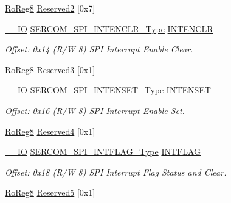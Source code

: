 \begin{DoxyCompactItemize}
\mbox{\hyperlink{group___s_a_m_d21_e15_a__definitions_ga0d957f1433aaf5d70e4dc2b68288442d}{Ro\+Reg8}} \mbox{\hyperlink{struct_sercom_spi_a7cc707677b50fdb014ad80a86239b7e8}{Reserved2}} \mbox{[}0x7\mbox{]}
\item 
\mbox{\hyperlink{core__cm0plus_8h_aec43007d9998a0a0e01faede4133d6be}{\+\_\+\+\_\+\+IO}} \mbox{\hyperlink{union_s_e_r_c_o_m___s_p_i___i_n_t_e_n_c_l_r___type}{S\+E\+R\+C\+O\+M\+\_\+\+S\+P\+I\+\_\+\+I\+N\+T\+E\+N\+C\+L\+R\+\_\+\+Type}} \mbox{\hyperlink{struct_sercom_spi_ad0704225f5b66d551a059865c2cbec3f}{I\+N\+T\+E\+N\+C\+LR}}
\begin{DoxyCompactList}\small\item\em Offset\+: 0x14 (R/W 8) S\+PI Interrupt Enable Clear. \end{DoxyCompactList}\item 
\mbox{\hyperlink{group___s_a_m_d21_e15_a__definitions_ga0d957f1433aaf5d70e4dc2b68288442d}{Ro\+Reg8}} \mbox{\hyperlink{struct_sercom_spi_ae12c3e940f27988a085afebe2f779a21}{Reserved3}} \mbox{[}0x1\mbox{]}
\item 
\mbox{\hyperlink{core__cm0plus_8h_aec43007d9998a0a0e01faede4133d6be}{\+\_\+\+\_\+\+IO}} \mbox{\hyperlink{union_s_e_r_c_o_m___s_p_i___i_n_t_e_n_s_e_t___type}{S\+E\+R\+C\+O\+M\+\_\+\+S\+P\+I\+\_\+\+I\+N\+T\+E\+N\+S\+E\+T\+\_\+\+Type}} \mbox{\hyperlink{struct_sercom_spi_aa6019ca5b141d15219af0b13b78465a6}{I\+N\+T\+E\+N\+S\+ET}}
\begin{DoxyCompactList}\small\item\em Offset\+: 0x16 (R/W 8) S\+PI Interrupt Enable Set. \end{DoxyCompactList}\item 
\mbox{\hyperlink{group___s_a_m_d21_e15_a__definitions_ga0d957f1433aaf5d70e4dc2b68288442d}{Ro\+Reg8}} \mbox{\hyperlink{struct_sercom_spi_a5ca570382e961b7801aeafc161de2571}{Reserved4}} \mbox{[}0x1\mbox{]}
\item 
\mbox{\hyperlink{core__cm0plus_8h_aec43007d9998a0a0e01faede4133d6be}{\+\_\+\+\_\+\+IO}} \mbox{\hyperlink{union_s_e_r_c_o_m___s_p_i___i_n_t_f_l_a_g___type}{S\+E\+R\+C\+O\+M\+\_\+\+S\+P\+I\+\_\+\+I\+N\+T\+F\+L\+A\+G\+\_\+\+Type}} \mbox{\hyperlink{struct_sercom_spi_ab17ab7d83f3569498cf87a144aa6188b}{I\+N\+T\+F\+L\+AG}}
\begin{DoxyCompactList}\small\item\em Offset\+: 0x18 (R/W 8) S\+PI Interrupt Flag Status and Clear. \end{DoxyCompactList}\item 
\mbox{\hyperlink{group___s_a_m_d21_e15_a__definitions_ga0d957f1433aaf5d70e4dc2b68288442d}{Ro\+Reg8}} \mbox{\hyperlink{struct_sercom_spi_a7321f81c873f0c6c846004e246ac204d}{Reserved5}} \mbox{[}0x1\mbox{]}

\end{DoxyCompactItemize}
